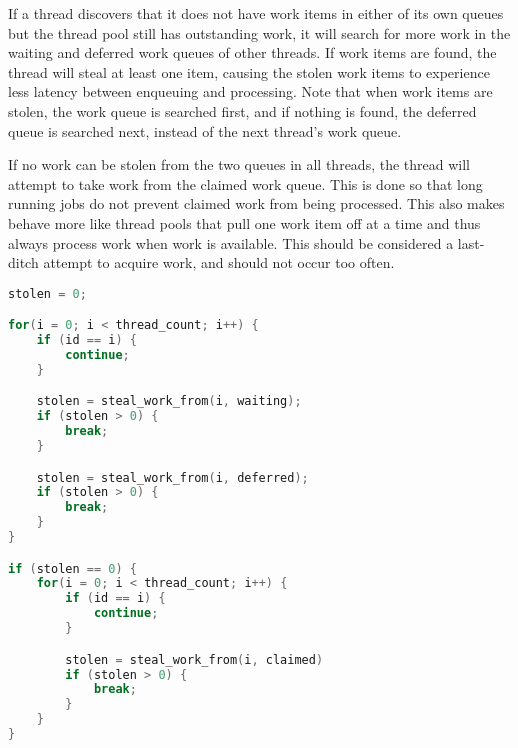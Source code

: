 If a thread discovers that it does not have work items in either of
its own queues but the thread pool still has outstanding work, it will
search for more work in the waiting and deferred work queues of other
threads. If work items are found, the thread will steal at least one
item, causing the stolen work items to experience less latency between
enqueuing and processing. Note that when work items are stolen, the
work queue is searched first, and if nothing is found, the deferred
queue is searched next, instead of the next thread's work queue.

If no work can be stolen from the two queues in all threads, the
thread will attempt to take work from the claimed work queue. This is
done so that long running jobs do not prevent claimed work from being
processed. This also makes \qptp behave more like thread pools that
pull one work item off at a time and thus always process work when
work is available. This should be considered a last-ditch attempt to
acquire work, and should not occur too often.

\begin{lstlisting}[language=C++,
    frame=lines,
    keepspaces,
    tabsize=4,
    caption=Queue Selection Order When Stealing Work,
    captionpos=b]
stolen = 0;

for(i = 0; i < thread_count; i++) {
    if (id == i) {
        continue;
    }

    stolen = steal_work_from(i, waiting);
    if (stolen > 0) {
        break;
    }

    stolen = steal_work_from(i, deferred);
    if (stolen > 0) {
        break;
    }
}

if (stolen == 0) {
    for(i = 0; i < thread_count; i++) {
        if (id == i) {
            continue;
        }

        stolen = steal_work_from(i, claimed)
        if (stolen > 0) {
            break;
        }
    }
}
\end{lstlisting}

